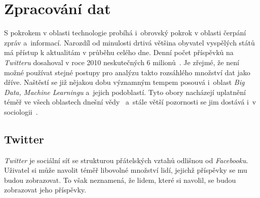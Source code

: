 \documentclass[12pt, a4paper]{article}
\numberwithin{equation}{section} 	%
\begin{document}
\newpage
\section{Zpracování dat}
\noindent S pokrokem v oblasti technologie probíhá i~obrovský pokrok v oblasti čerpání zpráv a~informací. Narozdíl od minulosti drtivá většina obyvatel vyspělých států má přístup k aktualitám v průběhu celého dne. Denní počet příspěvků na \textit{Twitteru} dosahoval v roce 2010 neskutečných 6 milionů~\cite{Mathioudakis2010}. Je zřejmé, že není možné používat stejné postupy pro analýzu takto rozsáhlého množství dat jako dříve. Naštěstí se již nějakou dobu významným tempem posouvá i~oblast \textit{Big Data, Machine Learningu} a~jejich podoblastí. Tyto obory nacházejí uplatnění téměř ve všech oblastech dnešní vědy~\cite{Huberman2012-2-15} a~stále větší pozornosti se jim dostává i~v sociologii~\cite{Tinati2014, McFarland2016, Shah2015-04-09}.


\subsection{Twitter}
\noindent\textit{Twitter} je sociální síť se strukturou přátelských vztahů odlišnou od \textit{Facebooku}. Uživatel si může navolit téměř libovolné množství lidí, jejichž příspěvky se mu budou zobrazovat. To však neznamená, že lidem, které si navolil, se budou zobrazovat jeho příspěvky.
\end{document}
